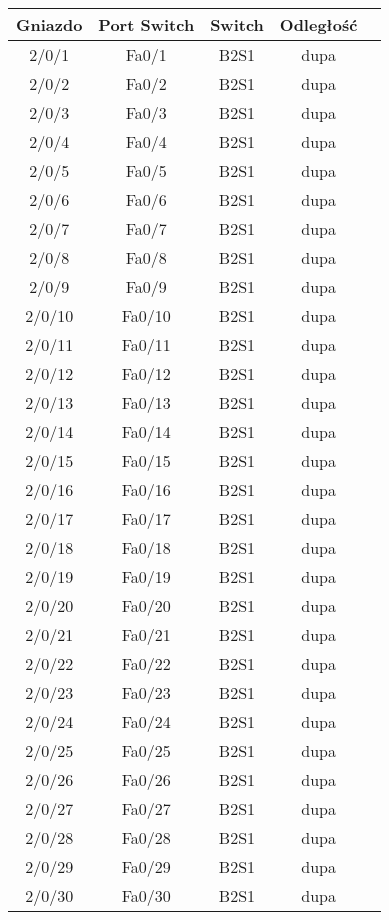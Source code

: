 \begin{center}
    \begin{longtable}{|c|c|c|c|c|}
    \hline
    Gniazdo & Port Switch & Switch & Odległość \\ \hline
	2/0/1 & Fa0/1 & B2S1 & dupa \\ \hline
	2/0/2 & Fa0/2 & B2S1 & dupa \\ \hline
	2/0/3 & Fa0/3 & B2S1 & dupa \\ \hline
	2/0/4 & Fa0/4 & B2S1 & dupa \\ \hline
	2/0/5 & Fa0/5 & B2S1 & dupa \\ \hline
	2/0/6 & Fa0/6 & B2S1 & dupa \\ \hline
	2/0/7 & Fa0/7 & B2S1 & dupa \\ \hline
	2/0/8 & Fa0/8 & B2S1 & dupa \\ \hline
	2/0/9 & Fa0/9 & B2S1 & dupa \\ \hline
	2/0/10 & Fa0/10 & B2S1 & dupa \\ \hline
	2/0/11 & Fa0/11 & B2S1 & dupa \\ \hline
	2/0/12 & Fa0/12 & B2S1 & dupa \\ \hline
	2/0/13 & Fa0/13 & B2S1 & dupa \\ \hline
	2/0/14 & Fa0/14 & B2S1 & dupa \\ \hline
	2/0/15 & Fa0/15 & B2S1 & dupa \\ \hline
	2/0/16 & Fa0/16 & B2S1 & dupa \\ \hline
	2/0/17 & Fa0/17 & B2S1 & dupa \\ \hline
	2/0/18 & Fa0/18 & B2S1 & dupa \\ \hline
	2/0/19 & Fa0/19 & B2S1 & dupa \\ \hline
	2/0/20 & Fa0/20 & B2S1 & dupa \\ \hline
	2/0/21 & Fa0/21 & B2S1 & dupa \\ \hline
	2/0/22 & Fa0/22 & B2S1 & dupa \\ \hline
	2/0/23 & Fa0/23 & B2S1 & dupa \\ \hline
	2/0/24 & Fa0/24 & B2S1 & dupa \\ \hline
	2/0/25 & Fa0/25 & B2S1 & dupa \\ \hline
	2/0/26 & Fa0/26 & B2S1 & dupa \\ \hline
	2/0/27 & Fa0/27 & B2S1 & dupa \\ \hline
	2/0/28 & Fa0/28 & B2S1 & dupa \\ \hline
	2/0/29 & Fa0/29 & B2S1 & dupa \\ \hline
	2/0/30 & Fa0/30 & B2S1 & dupa \\ \hline

\end{longtable}
\end{center}
